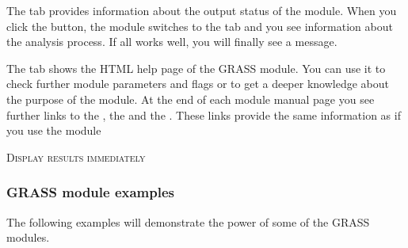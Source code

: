 
The  tab provides information about the output status of the 
module. When you click the  button, the module switches to the 
 tab and you see information about the analysis process. If all 
works well, you will finally see a  message.


The  tab shows the HTML help page of the GRASS module. You can 
use it to check further module parameters and flags or to get a deeper 
knowledge about the purpose of the module. At the end of each module 
manual page you see further links to the , the 
 and the . These links provide 
the same information as if you use the module  

\begin{Tip}\caption{\textsc{Display results immediately}}
\end{Tip} 

\subsubsection{GRASS module examples}
The following examples will demonstrate the power of some of the GRASS modules. 

